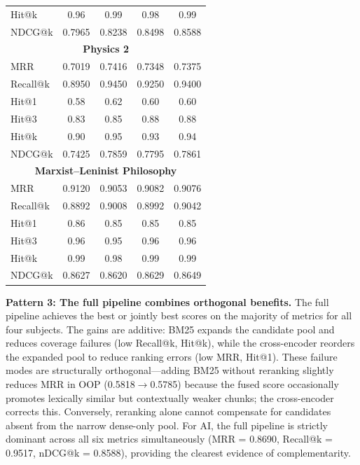 \documentclass[runningheads]{llncs}
\begin{document}
\begin{table}[!t]
\begin{tabular}{l@{\hspace{8pt}}c@{\hspace{8pt}}c@{\hspace{8pt}}c@{\hspace{8pt}}c}
Hit@k      & 0.96   & 0.99   & 0.98   & 0.99   \\
NDCG@k     & 0.7965 & 0.8238 & 0.8498 & 0.8588 \\
\midrule
\multicolumn{5}{c}{\textbf{Physics 2}} \\
\midrule
MRR        & 0.7019 & 0.7416 & 0.7348 & 0.7375 \\
Recall@k   & 0.8950 & 0.9450 & 0.9250 & 0.9400 \\
Hit@1      & 0.58   & 0.62   & 0.60   & 0.60   \\
Hit@3      & 0.83   & 0.85   & 0.88   & 0.88   \\
Hit@k      & 0.90   & 0.95   & 0.93   & 0.94   \\
NDCG@k     & 0.7425 & 0.7859 & 0.7795 & 0.7861 \\
\midrule
\multicolumn{5}{c}{\textbf{Marxist--Leninist Philosophy}} \\
\midrule
MRR        & 0.9120 & 0.9053 & 0.9082 & 0.9076 \\
Recall@k   & 0.8892 & 0.9008 & 0.8992 & 0.9042 \\
Hit@1      & 0.86   & 0.85   & 0.85   & 0.85   \\
Hit@3      & 0.96   & 0.95   & 0.96   & 0.96   \\
Hit@k      & 0.99   & 0.98   & 0.99   & 0.99   \\
NDCG@k     & 0.8627 & 0.8620 & 0.8629 & 0.8649 \\
\bottomrule
\end{tabular}
\end{table}

\FloatBarrier

\noindent\textbf{Pattern 3: The full pipeline combines orthogonal benefits.} The full pipeline achieves the best or jointly best scores on the majority of metrics for all four subjects. The gains are additive: BM25 expands the candidate pool and reduces coverage failures (low Recall@k, Hit@k), while the cross-encoder reorders the expanded pool to reduce ranking errors (low MRR, Hit@1). These failure modes are structurally orthogonal---adding BM25 without reranking slightly reduces MRR in OOP (0.5818$\to$0.5785) because the fused score occasionally promotes lexically similar but contextually weaker chunks; the cross-encoder corrects this. Conversely, reranking alone cannot compensate for candidates absent from the narrow dense-only pool. For AI, the full pipeline is strictly dominant across all six metrics simultaneously (MRR = 0.8690, Recall@k = 0.9517, nDCG@k = 0.8588), providing the clearest evidence of complementarity.
\end{document}
